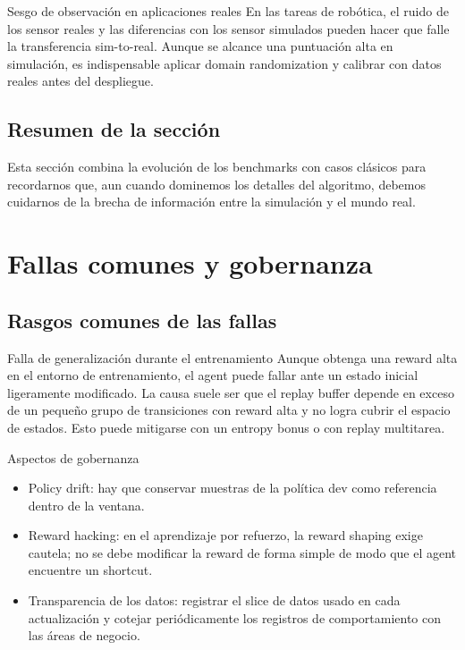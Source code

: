 \documentclass[a4paper]{article}
\begin{document}
\begin{warningbox}{Sesgo de observación en aplicaciones reales}
En las tareas de robótica, el ruido de los sensor reales y las diferencias con los sensor simulados pueden hacer que falle la transferencia sim-to-real. Aunque se alcance una puntuación alta en simulación, es indispensable aplicar domain randomization y calibrar con datos reales antes del despliegue.
\end{warningbox}

\subsection{Resumen de la sección}

Esta sección combina la evolución de los benchmarks con casos clásicos para recordarnos que, aun cuando dominemos los detalles del algoritmo, debemos cuidarnos de la brecha de información entre la simulación y el mundo real.
\section{Fallas comunes y gobernanza}

\subsection{Rasgos comunes de las fallas}

\begin{warningbox}{Falla de generalización durante el entrenamiento}
Aunque obtenga una reward alta en el entorno de entrenamiento, el agent puede fallar ante un estado inicial ligeramente modificado. La causa suele ser que el replay buffer depende en exceso de un pequeño grupo de transiciones con reward alta y no logra cubrir el espacio de estados. Esto puede mitigarse con un entropy bonus o con replay multitarea.
\end{warningbox}

\begin{knowledgebox}{Aspectos de gobernanza}
\begin{itemize}
    \item Policy drift: hay que conservar muestras de la política dev como referencia dentro de la ventana.
    \item Reward hacking: en el aprendizaje por refuerzo, la reward shaping exige cautela; no se debe modificar la reward de forma simple de modo que el agent encuentre un shortcut.
    \item Transparencia de los datos: registrar el slice de datos usado en cada actualización y cotejar periódicamente los registros de comportamiento con las áreas de negocio.
\end{itemize}
\end{knowledgebox}
\end{document}
